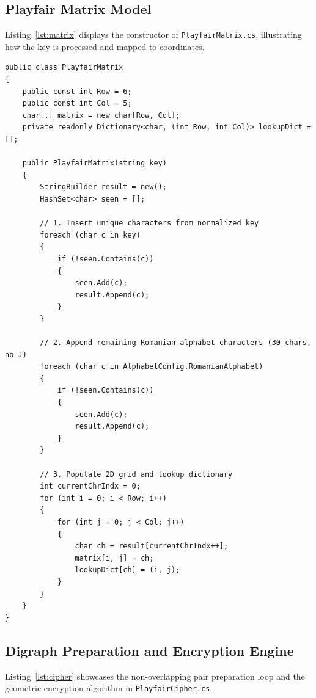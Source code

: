 \documentclass[12pt,a4paper]{article}
\begin{document}
\subsection{Playfair Matrix Model}
Listing~\ref{lst:matrix} displays the constructor of \texttt{PlayfairMatrix.cs}, illustrating how the key is processed and mapped to coordinates.

\begin{lstlisting}[caption={PlayfairMatrix Constructor and Mapping Logic}, label={lst:matrix}]
public class PlayfairMatrix
{
    public const int Row = 6;
    public const int Col = 5;
    char[,] matrix = new char[Row, Col];
    private readonly Dictionary<char, (int Row, int Col)> lookupDict = [];

    public PlayfairMatrix(string key)
    {
        StringBuilder result = new();
        HashSet<char> seen = [];

        // 1. Insert unique characters from normalized key
        foreach (char c in key)
        {
            if (!seen.Contains(c))
            {
                seen.Add(c);
                result.Append(c);
            }
        }

        // 2. Append remaining Romanian alphabet characters (30 chars, no J)
        foreach (char c in AlphabetConfig.RomanianAlphabet)
        {
            if (!seen.Contains(c))
            {
                seen.Add(c);
                result.Append(c);
            }
        }

        // 3. Populate 2D grid and lookup dictionary
        int currentChrIndx = 0;
        for (int i = 0; i < Row; i++)
        {
            for (int j = 0; j < Col; j++)
            {
                char ch = result[currentChrIndx++];
                matrix[i, j] = ch;
                lookupDict[ch] = (i, j);
            }
        }
    }
}
\end{lstlisting}

\subsection{Digraph Preparation and Encryption Engine}
Listing~\ref{lst:cipher} showcases the non-overlapping pair preparation loop and the geometric encryption algorithm in \texttt{PlayfairCipher.cs}.
\end{document}
